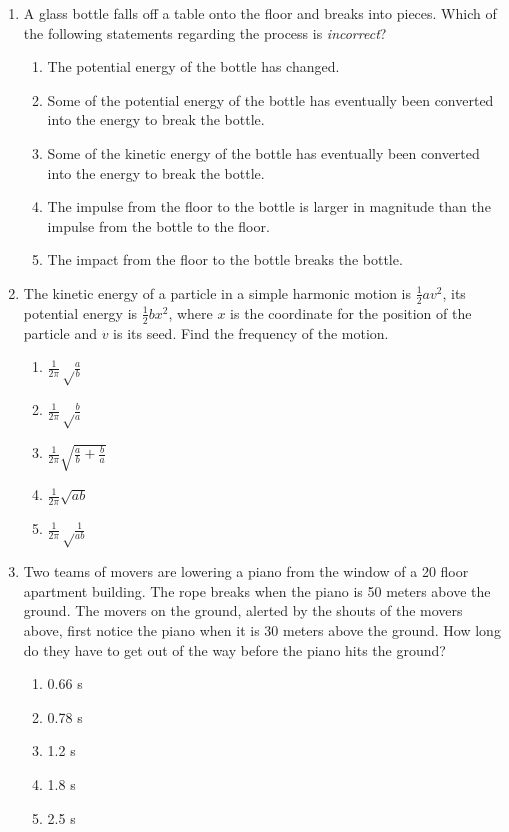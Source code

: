 \documentclass[12pt,letterpaper]{article}
\begin{document}
\begin{enumerate}
\item
A glass bottle falls off a table onto the floor and breaks into pieces. Which of the following statements regarding the process is \emph{incorrect}?
\begin{enumerate}
\item The potential energy of the bottle has changed.
\item Some of the potential energy of the bottle has eventually been converted into the energy to break the bottle.
\item Some of the kinetic energy of the bottle has eventually been converted into the energy to break the bottle.
\item The impulse from the floor to the bottle is larger in magnitude than the impulse from the bottle to the floor.
\item The impact from the floor to the bottle breaks the bottle.
\end{enumerate}

\item
The kinetic energy of a particle in a simple harmonic motion is $\frac{1}{2}av^2$, its potential energy is $\frac{1}{2}bx^2$, where $x$ is the coordinate for the position of the particle and $v$ is its seed. Find the frequency of the motion.
\begin{enumerate}
\item $\displaystyle \frac{1}{2\pi}\sqrt\frac{a}{b}$
\item $\displaystyle \frac{1}{2\pi}\sqrt\frac{b}{a}$
\item $\displaystyle \frac{1}{2\pi}\sqrt{\frac{a}{b}+\frac{b}{a}}$
\item $\displaystyle \frac{1}{2\pi}\sqrt{ab}$
\item $\displaystyle \frac{1}{2\pi}\sqrt\frac{1}{ab}$
\end{enumerate}

\item
Two teams of movers are lowering a piano from the window of a 20 floor apartment building. The rope breaks when the piano is 50 meters above the ground. The movers on the ground, alerted by the shouts of the movers above, first notice the piano when it is 30 meters above the ground. How long do they have to get out of the way before the piano hits the ground?
\begin{enumerate}
\item 0.66 s
\item 0.78 s
\item 1.2 s
\item 1.8 s
\item 2.5 s
\end{enumerate}


\end{enumerate}
\end{document}
